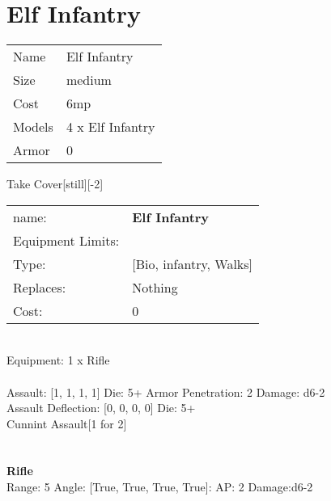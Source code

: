 \pagebreak

\section{ Elf Infantry }

\begin{tabular}{ll}
  Name & Elf Infantry \\
  Size & medium\\
  Cost & 6mp\\
  Models & 4 x Elf Infantry\\
  Armor & 0\\
\end{tabular}

\noindent Take Cover[still][-2]\\ 


\noindent
\begin{tabular}{ll}
name: &{\bf Elf Infantry } \\
Equipment Limits: & \\
Type: &[Bio, infantry, Walks] \\
Replaces: &Nothing \\
Cost: & 0\\
\end{tabular}
\ \\
Equipment: 1 x Rifle \\
\ \\
Assault: [1, 1, 1, 1] Die: 5+ Armor Penetration: 2 Damage: d6-2 \\
Assault Deflection: [0, 0, 0, 0] Die: 5+\\
\indent Cunnint Assault[1 for 2]\\ 
 
\ \\

\ \\
{\bf Rifle } \\



Range: 5  Angle: [True, True, True, True]: AP: 2 Damage:d6-2 \\




 
\ \\



